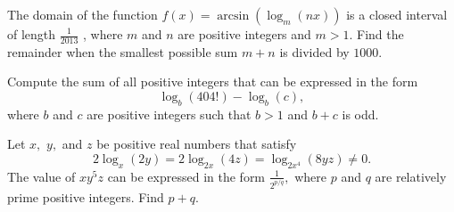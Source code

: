 \documentclass{article}
\begin{document}
\begin{prob}[AIME I 2013/8]{6}
The domain of the function $f(x) = \arcsin(\log_{m}(nx))$ is a closed interval of length $\frac{1}{2013}$ , where $m$ and $n$ are positive integers and $m>1$. Find the remainder when the smallest possible sum $m+n$ is divided by $1000.$
\end{prob}

\begin{prob}{6}
Compute the sum of all positive integers that can be expressed in the form \[\log_b(404!) - \log_b(c), \] where $b$ and $c$ are positive integers such that $b>1$ and $b+c$ is odd.
\end{prob}

\begin{prob}[AIME I 2012/9]{9}
Let $x,$ $y,$ and $z$ be positive real numbers that satisfy \[2\log_{x}(2y) = 2\log_{2x}(4z) = \log_{2x^4}(8yz) \ne 0.\] The value of $xy^5z$ can be expressed in the form $\frac{1}{2^{p/q}},$ where $p$ and $q$ are relatively prime positive integers. Find $p+q.$
\end{prob}
\end{document}
